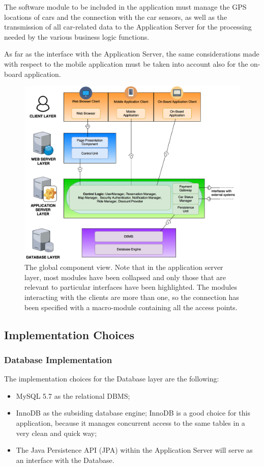 The software module to be included in the application must manage the GPS locations of cars and the connection with the car sensors, as well as the transmission of all car-related data to the Application Server for the processing needed by the various business logic functions.

As far as the interface with the Application Server, the same considerations made with respect to the mobile application must be taken into account also for the on-board application.

\begin{figure}[H]
\begin{center}
		\includegraphics[width=\textwidth]{./arch_design/diagrams/global_comp_view.png}
		\caption{The global component view. Note that in the application server layer, most modules have been collapsed and only those that are relevant to particular interfaces have been highlighted. The modules interacting with the clients are more than one, so the connection has been specified with a macro-module containing all the access points.}
		\label{global_comp_view}
\end{center}
\end{figure}

\subsection{Implementation Choices}
\subsubsection{Database Implementation}
The implementation choices for the Database layer are the following:
\begin{itemize}
\item MySQL 5.7 as the relational DBMS;
\item InnoDB as the subsiding database engine; InnoDB is a good choice for this application, because it manages concurrent access to the same tables in a very clean and quick way;
\item The Java Persistence API (JPA) within the Application Server will serve as an interface with the Database.
\end{itemize}

